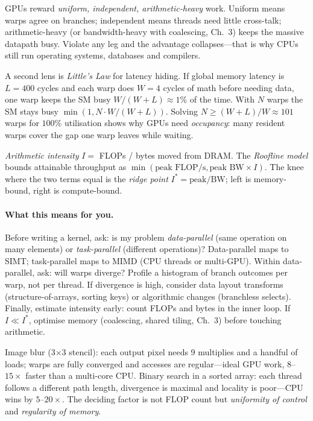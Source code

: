 \begin{remark}
GPUs reward \emph{uniform, independent, arithmetic-heavy} work. Uniform means warps agree on branches; independent means threads need little cross-talk; arithmetic-heavy (or bandwidth-heavy with coalescing, Ch.~3) keeps the massive datapath busy. Violate any leg and the advantage collapses---that is why CPUs still run operating systems, databases and compilers.
\end{remark}

A second lens is \emph{Little's Law} for latency hiding. If global memory latency is $L=400$ cycles and each warp does $W=4$ cycles of math before needing data, one warp keeps the SM busy $W/(W+L)\approx1\%$ of the time. With $N$ warps the SM stays busy $\min(1, N\cdot W/(W+L))$. Solving $N\ge (W+L)/W\approx101$ warps for $100\%$ utilisation shows why GPUs need \emph{occupancy}: many resident warps cover the gap one warp leaves while waiting.

\begin{definition}
\emph{Arithmetic intensity} $I=$ FLOPs / bytes moved from DRAM. The \emph{Roofline model} bounds attainable throughput as $\min(\text{peak FLOP/s}, \text{peak BW}\times I)$. The knee where the two terms equal is the \emph{ridge point} $I^*=\text{peak}/\text{BW}$; left is memory-bound, right is compute-bound.
\end{definition}

\paragraph{What this means for you.} Before writing a kernel, ask: is my problem \emph{data-parallel} (same operation on many elements) or \emph{task-parallel} (different operations)? Data-parallel maps to SIMT; task-parallel maps to MIMD (CPU threads or multi-GPU). Within data-parallel, ask: will warps diverge? Profile a histogram of branch outcomes per warp, not per thread. If divergence is high, consider data layout transforms (structure-of-arrays, sorting keys) or algorithmic changes (branchless selects). Finally, estimate intensity early: count FLOPs and bytes in the inner loop. If $I\ll I^*$, optimise memory (coalescing, shared tiling, Ch.~3) before touching arithmetic.

\begin{example}
Image blur (3$\times$3 stencil): each output pixel needs 9 multiplies and a handful of loads; warps are fully converged and accesses are regular---ideal GPU work, $8$--$15\times$ faster than a multi-core CPU. Binary search in a sorted array: each thread follows a different path length, divergence is maximal and locality is poor---CPU wins by $5$--$20\times$. The deciding factor is not FLOP count but \emph{uniformity of control} and \emph{regularity of memory}.
\end{example}

